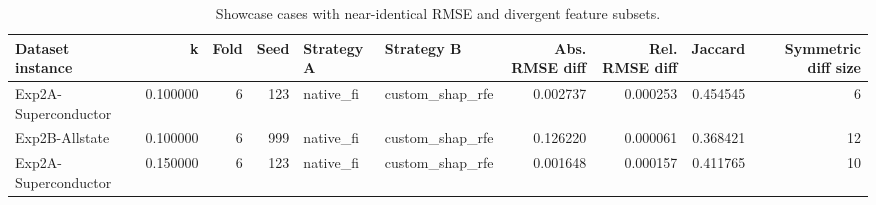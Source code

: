 \begin{table}
\caption{Showcase cases with near-identical RMSE and divergent feature subsets.}
\label{tab:showcase_cases}
\begin{tabular}{lrrrllrrrr}
\toprule
Dataset instance & k & Fold & Seed & Strategy A & Strategy B & Abs. RMSE diff & Rel. RMSE diff & Jaccard & Symmetric diff size \\
\midrule
Exp2A-Superconductor & 0.100000 & 6 & 123 & native\_fi & custom\_shap\_rfe & 0.002737 & 0.000253 & 0.454545 & 6 \\
Exp2B-Allstate & 0.100000 & 6 & 999 & native\_fi & custom\_shap\_rfe & 0.126220 & 0.000061 & 0.368421 & 12 \\
Exp2A-Superconductor & 0.150000 & 6 & 123 & native\_fi & custom\_shap\_rfe & 0.001648 & 0.000157 & 0.411765 & 10 \\
\bottomrule
\end{tabular}
\end{table}
